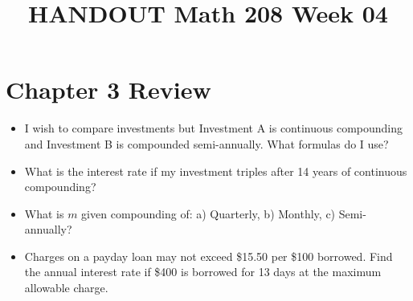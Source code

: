 \documentclass[14pt]{extarticle}
\title{\vspace{-5ex}HANDOUT Math 208 Week 04}
\date{\vspace{-10ex}}
\begin{document}
\maketitle	
{}	
\section*{Chapter 3 Review}
\begin{itemize}
	\item I wish to compare investments but Investment A is continuous compounding and Investment B is compounded semi-annually. What formulas do I use?
	\item What is the interest rate if my investment triples after 14 years of continuous compounding?
	\item What is $m$ given compounding of: a) Quarterly, b) Monthly, c) Semi-annually?
	\item  Charges on a payday loan may not exceed \$15.50 per \$100 borrowed. Find the annual interest rate if \$400 is borrowed for 13 days at the maximum allowable charge.
\end{itemize}
\end{document}
